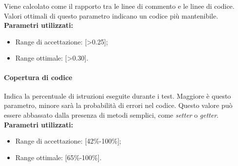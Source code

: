 Viene calcolato come il rapporto tra le linee di commento e le linee di codice. Valori ottimali di questo parametro indicano un codice più mantenibile. \newline
\textbf{Parametri utilizzati:}
\begin{itemize}
	\item Range di accettazione: [>0.25];
	\item Range ottimale: [>0.30].
\end{itemize}

\paragraph{Copertura di codice}

Indica la percentuale di istruzioni eseguite durante i test. Maggiore è questo parametro, minore sarà la probabilità di errori nel codice. Questo valore può essere abbassato dalla presenza di metodi semplici, come \textit{setter} o \textit{getter}. \newline
\textbf{Parametri utilizzati:}
\begin{itemize}
	\item Range di accettazione: [42\%-100\%];
	\item Range ottimale: [65\%-100\%].
\end{itemize}
\newpage
